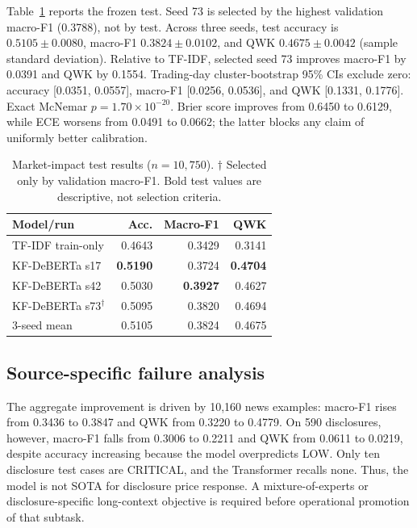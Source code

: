 \documentclass[11pt]{article}
\begin{document}
Table~\ref{tab:impact} reports the frozen test. Seed 73 is selected by the highest validation macro-F1 (0.3788), not by test. Across three seeds, test accuracy is $0.5105\pm0.0080$, macro-F1 $0.3824\pm0.0102$, and QWK $0.4675\pm0.0042$ (sample standard deviation). Relative to TF-IDF, selected seed 73 improves macro-F1 by 0.0391 and QWK by 0.1554. Trading-day cluster-bootstrap 95\% CIs exclude zero: accuracy [0.0351, 0.0557], macro-F1 [0.0256, 0.0536], and QWK [0.1331, 0.1776]. Exact McNemar $p=1.70\times10^{-20}$. Brier score improves from 0.6450 to 0.6129, while ECE worsens from 0.0491 to 0.0662; the latter blocks any claim of uniformly better calibration.

\begin{table}[t]
\centering
\small
\begin{tabular}{lrrr}
\toprule
Model/run & Acc. & Macro-F1 & QWK \\
\midrule
TF-IDF train-only & 0.4643 & 0.3429 & 0.3141 \\
KF-DeBERTa s17 & \textbf{0.5190} & 0.3724 & \textbf{0.4704} \\
KF-DeBERTa s42 & 0.5030 & \textbf{0.3927} & 0.4627 \\
KF-DeBERTa s73$^\dagger$ & 0.5095 & 0.3820 & 0.4694 \\
3-seed mean & 0.5105 & 0.3824 & 0.4675 \\
\bottomrule
\end{tabular}
\caption{Market-impact test results ($n=10{,}750$). $\dagger$ Selected only by validation macro-F1. Bold test values are descriptive, not selection criteria.}
\label{tab:impact}
\end{table}

\subsection{Source-specific failure analysis}

The aggregate improvement is driven by 10,160 news examples: macro-F1 rises from 0.3436 to 0.3847 and QWK from 0.3220 to 0.4779. On 590 disclosures, however, macro-F1 falls from 0.3006 to 0.2211 and QWK from 0.0611 to 0.0219, despite accuracy increasing because the model overpredicts LOW. Only ten disclosure test cases are CRITICAL, and the Transformer recalls none. Thus, the model is not SOTA for disclosure price response. A mixture-of-experts or disclosure-specific long-context objective is required before operational promotion of that subtask.
\end{document}
